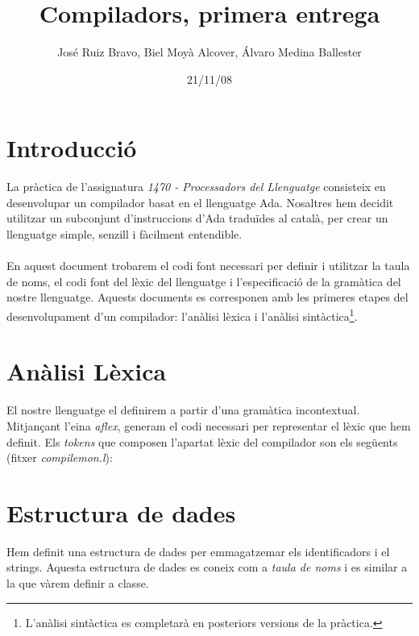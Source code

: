 \documentclass[10pt]{article}
\title{Compiladors, primera entrega}
\author{José Ruiz Bravo, Biel Moyà Alcover, Álvaro Medina Ballester}
\date{21/11/08}
\begin{document}
	\maketitle
	\section{Introducció}
		La pràctica de l'assignatura \textit{1470 - Processadors del Llenguatge} consisteix en
		desenvolupar un compilador basat en el llenguatge Ada. Nosaltres hem decidit 
		utilitzar un subconjunt d'instruccions d'Ada traduïdes al català, per crear
		un llenguatge simple, senzill i fàcilment entendible.
		\\
		\\
		En aquest document trobarem el codi font necessari per definir i utilitzar la
		taula de noms, el codi font del lèxic del llenguatge i l'especificació de la
		gramàtica del nostre llenguatge. Aquests documents es corresponen amb les primeres
		etapes del desenvolupament d'un compilador: l'anàlisi lèxica i l'anàlisi 			sintàctica\footnote{L'anàlisi sintàctica es completarà en posteriors versions de la 			pràctica.}.
	\newpage
	\section{Anàlisi Lèxica}
		El nostre llenguatge el definirem a partir d'una gramàtica incontextual. Mitjançant l'eina \textit{aflex}, generam el codi necessari per representar el lèxic que hem definit. Els \textit{tokens} que composen l'apartat lèxic del compilador son els següents (fitxer \textit{compilemon.l}):
		\\
	
	
	\newpage
	\section{Estructura de dades}
		Hem definit una estructura de dades per emmagatzemar els identificadors i el strings. Aquesta estructura de dades es coneix com a \textit{taula de noms} i es similar a la que vàrem definir a classe.
		\\
		
\end{document}
